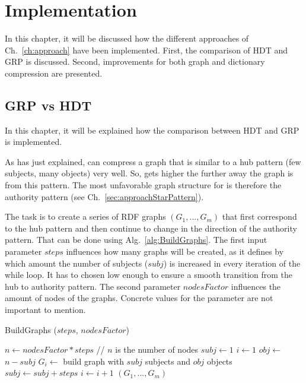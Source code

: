 \chapter{Implementation}\label{ch:implementation}

In this chapter, it will be discussed how the different approaches of Ch.~\ref{ch:approach} have been implemented. First, the comparison of HDT and GRP is discussed. Second, improvements for both graph and dictionary compression are presented.

\section{GRP vs HDT}\label{sec:implementationGRPvsHDT}

In this chapter, it will be explained how the comparison between HDT and GRP is implemented.

As has just explained, \GHDT{} can compress a graph that is similar to a hub pattern (few subjects, many objects) very well. So,  gets higher the further away the graph is from this pattern. The most unfavorable graph structure for \GHDT{} is therefore the authority pattern (see Ch.~\ref{sec:approachStarPattern}).

The task is to create a series of RDF graphs $(G_1,...,G_m)$ that first correspond to the hub pattern and then continue to change in the direction of the authority pattern. That can be done using Alg.~\ref{alg:BuildGraphs}. The first input parameter $steps$ influences how many graphs will be created, as it defines by which amount the number of subjects ($subj$) is increased in every iteration of the while loop. It has to chosen low enough to ensure a smooth transition from the hub to authority pattern. The second parameter $nodesFactor$ influences the amount of nodes of the graphs. Concrete values for the parameter are not important to mention.

\begin{algorithm}
	\caption{BuildGraphs ($steps$, $ nodesFactor$)}\label{alg:BuildGraphs}
	\begin{algorithmic}[1]
		\State $n \leftarrow nodesFactor*steps$ // $n$ is the number of nodes
		\State $subj \leftarrow 1$
		\State $i \leftarrow 1$
		\State $obj \leftarrow$ $n-subj$ 
		\State $G_i \leftarrow$ build graph with $subj$ subjects and $obj$ objects\label{line:buildgraph}
		\State  $subj\leftarrow subj+steps$
		\State  $i\leftarrow i+1$
		\EndWhile
		\State \Return $(G_1,...,G_m)$
	\end{algorithmic}
\end{algorithm}

